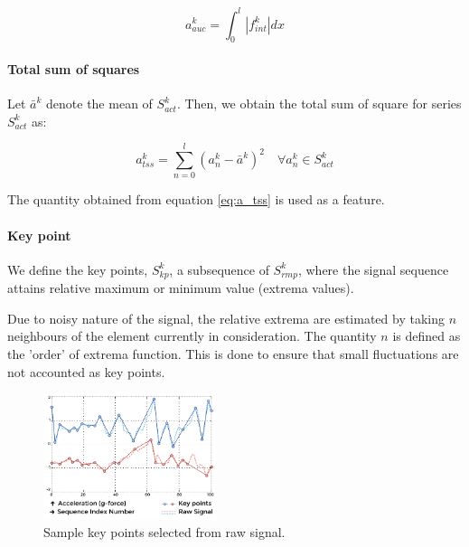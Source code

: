 \documentclass[5p]{elsarticle}
\begin{document}
\begin{equation} \label{eq:a_auc}
a_{auc}^k=\int_0^l |f_{int}^k| dx
\end{equation}


\paragraph{Total sum of squares}
Let $\bar{a}^k$ denote the mean of $S^k_{act}$. Then, we obtain the total sum of square for series $S^k_{act}$ as:

\begin{equation} \label{eq:a_tss}
a_{tss}^k = \sum_{n=0}^{l}(a^k_n - \bar{a}^k)^2 \quad \forall a^k_n \in S^k_{act}
\end{equation}

The quantity obtained from equation \ref{eq:a_tss} is used as a feature.

\paragraph{Key point}

We define the key points, $S^k_{kp}$, a subsequence of $S^k_{rmp}$, where the signal sequence attains relative maximum or minimum value (extrema values).

Due to noisy nature of the signal, the relative extrema are estimated by taking $n$ neighbours of the element currently in consideration. The quantity $n$ is defined as the 'order' of extrema function. This is done to ensure that small fluctuations are not accounted as key points.

\begin{figure}[h!]
  \begin{center}
    \includegraphics[width=0.45\textwidth]{keypoint_feature}
  \end{center}
  \vspace{-10pt}
  \caption{\label{keypoint_feature}Sample key points selected from raw signal.}
  \vspace{-10pt}
\end{figure}
\end{document}
